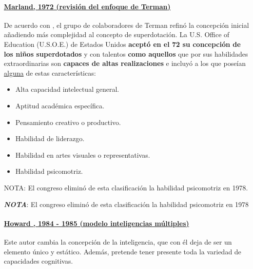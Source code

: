 \documentclass[12pt, a4paper]{article}
\begin{document}
	\paragraph{\underline{Marland, 1972 (revisión del enfoque de Terman)}} De acuerdo con \textcite{Arocas2002OrientPsicopedGVA}, el grupo de colaboradores de Terman refinó la concepción inicial añadiendo más complejidad al concepto de superdotación. La U.S. Office of Education
	(U.S.O.E.) de Estados Unidos\textbf{ aceptó en el 72 su concepción de los niños superdotados} y con talentos \textbf{como aquellos} que por sus habilidades extraordinarias son \textbf{capaces de altas realizaciones} e incluyó a los que poseían \underline{alguna} de estas características:
	
	\begin{itemize}[noitemsep]
		\item Alta capacidad intelectual general.
		\item Aptitud académica específica.
		\item Pensamiento creativo o productivo.
		\item Habilidad de liderazgo.
		\item Habilidad en artes visuales o representativas.
		\item Habilidad psicomotriz.
	\end{itemize}
	
	NOTA: El congreso eliminó de esta clasificación la habilidad psicomotriz en 1978.
	
	\begin{tcolorbox}[
		colback=gray!10,
		colframe=gray!50,
		boxrule=0.5pt,
		arc=2mm
		]
		\textit{\textbf{NOTA}}: El congreso eliminó de esta clasificación la habilidad psicomotriz en 1978 \parencite{Arocas2002OrientPsicopedGVA}
	\end{tcolorbox}
	
	\paragraph{\underline{Howard , 1984 - 1985 (modelo inteligencias múltiples)}}
	\label{par:modelosCapacidades}
	
	Este autor cambia la concepción de la inteligencia, que con él deja de ser un elemento único y estático. Además, pretende tener presente toda la variedad de capacidades cognitivas.
	
\end{document}
